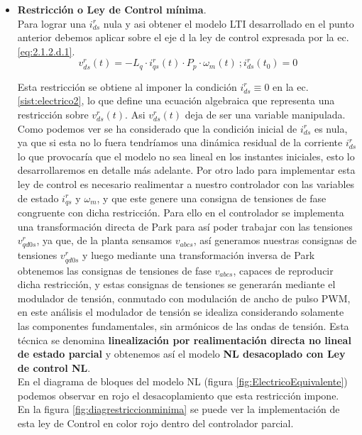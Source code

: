 \documentclass[10pt]{article}
\begin{document}
\begin{enumerate}
\begin{itemize}
	\item\textbf{ Restricción o Ley de Control mínima}.\\
	Para lograr una $i^{r}_{ds}$ nula y asi obtener el modelo LTI desarrollado en el punto anterior debemos aplicar sobre el eje d la ley de control expresada por la ec. \ref{eq:2.1.2.d.1}.
	\begin{equation}
	v^{r}_{ds}(t)=-L_{q}\cdot i^{r}_{qs}(t)\cdot P_{p}\cdot \omega_{m}(t)\ ; i^{r}_{ds}(t_{0})=0
	\label{eq:2.1.2.d.1}
	\end{equation}
	
	Esta restricción se obtiene al imponer la condición $i^{r}_{ds}\equiv 0$ en la ec.\ref{sist:electrico2}, lo que define una ecuación algebraica que representa una restricción sobre $v^{r}_{ds}(t)$. Asi $v^{r}_{ds}(t)$ deja de ser una variable manipulada. Como podemos ver se ha considerado que la condición inicial de $i^{r}_{ds}$ es nula, ya que si esta no lo fuera tendríamos una dinámica residual de la corriente $i^{r}_{ds}$ lo que provocaría que el modelo no sea lineal en los instantes iniciales, esto lo desarrollaremos en detalle más adelante. Por otro lado para implementar esta ley de control es necesario realimentar a nuestro controlador con las variables de estado $i^{r}_{qs}$ y $\omega_{m}$, y que este genere una consigna de tensiones de fase congruente con dicha restricción. Para ello en el controlador se implementa una transformación directa de Park para así poder trabajar con las tensiones $v^{r}_{qd0s}$, ya que, de la planta sensamos $v_{abcs}$, así generamos nuestras consignas de tensiones $v^{r}_{qd0s}$ y luego mediante una transformación inversa de Park obtenemos las consignas de tensiones de fase $v_{abcs}$, capaces de reproducir dicha restricción, y estas consignas de tensiones se generarán mediante el modulador de tensión, conmutado con modulación de ancho de pulso PWM, en este análisis el modulador de tensión se idealiza considerando solamente las componentes fundamentales, sin armónicos de las ondas de tensión. Esta técnica se denomina \textbf{linealización por realimentación directa no lineal de estado parcial} y obtenemos así el modelo \textbf{NL desacoplado con Ley de control NL}.\\
     En el diagrama de bloques del modelo NL (figura \ref{fig:ElectricoEquivalente}) podemos observar en rojo el desacoplamiento que esta restricción impone.\\
     En la figura \ref{fig:diagrestriccionminima} se puede ver la implementación de esta ley de Control en color rojo dentro del controlador parcial.


\end{itemize}
\end{enumerate}
\end{document}

